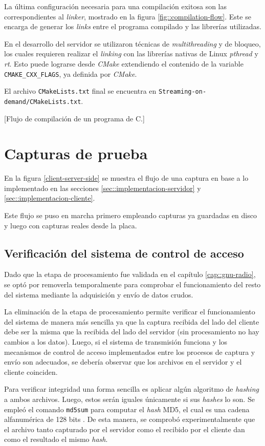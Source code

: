 \documentclass[../../main.tex]{subfiles}
\begin{document}
La última configuración necesaria para una compilación exitosa son las correspondientes al \textit{linker}, mostrado en la figura \ref{fig::compilation-flow}. Este se encarga de generar los \textit{links} entre el programa compilado y las librerías utilizadas.

En el desarrollo del servidor se utilizaron técnicas de \textit{multithreading} y de bloqueo, los cuales requieren realizar el \textit{linking} con las librerías nativas de Linux \textit{pthread} y \textit{rt}.  Esto puede lograrse desde \textit{CMake} extendiendo el contenido de la variable \texttt{CMAKE\_CXX\_FLAGS}, ya definida por \textit{CMake}.

El archivo \texttt{CMakeLists.txt} final se encuentra en \texttt{Streaming-on-demand/CMakeLists.txt}.

[Flujo de compilación de un programa de C.]

\section{Capturas de prueba}
En la figura \ref{client-server-side} se muestra el flujo de una captura en base a lo implementado en las secciones \ref{sec::implementacion-servidor} y \ref{sec::implementacion-cliente}.

Este flujo se puso en marcha primero empleando capturas ya guardadas en disco y luego con capturas reales desde la placa.

\subsection{Verificación del sistema de control de acceso}
Dado que la etapa de procesamiento fue validada en el capítulo \ref{cap::gnu-radio}, se optó por removerla temporalmente para comprobar el funcionamiento del resto del sistema mediante la adquisición y envío de datos crudos.

La eliminación de la etapa de procesamiento permite verificar el funcionamiento del sistema de manera más sencilla ya que la captura recibida del lado del cliente debe ser la misma que la recibida del lado del servidor (sin procesamiento no hay cambios a los datos). Luego, si el sistema de transmisión funciona y los mecanismos de control de acceso implementados entre los procesos de captura y envío son adecuados, se debería observar que los archivos en el servidor y el cliente coinciden.

Para verificar integridad una forma sencilla es aplicar algún algoritmo de \textit{hashing}  a ambos archivos. Luego, estos serán iguales únicamente si sus \textit{hashes} lo son. Se empleó el comando \texttt{md5sum} para computar el \textit{hash} MD5, el cual es una cadena alfanumérica de 128 bits . De esta manera, se comprobó experimentalmente que el archivo tanto capturado por el servidor como el recibido por el cliente dan como el resultado el mismo \textit{hash}.

\end{document}
